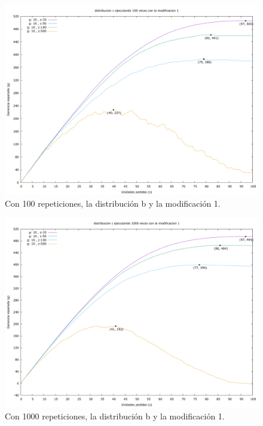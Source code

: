 \documentclass[12pt, spanish]{article}
\begin{document}
\begin{figure}[H]
	\centering
	\includegraphics[scale = 0.3]{prob_c/datos_c_100_1.png}
	\caption{Con 100 repeticiones, la distribución b y la modificación 1.}
	\label{fig:ej1_a_100}

\end{figure}

\begin{figure}[H]
	\centering
	\includegraphics[scale = 0.3]{prob_c/datos_c_1000_1.png}
	\caption{Con 1000 repeticiones, la distribución b y la modificación 1.}
	\label{fig:ej1_a_1000}

\end{figure}
\end{document}
